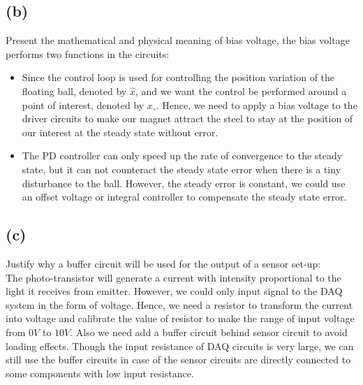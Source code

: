 \documentclass[letterpaper]{article}
\begin{document}
\subsection*{(b)}
Present the mathematical and physical meaning of bias voltage, the bias voltage performs two functions in the circuits:
\begin{itemize}
	\item Since the control loop is used for controlling the position variation of the floating ball, denoted by $\hat{x}$, and we want the control be performed around a point of interest, denoted by $x_\circ$. Hence, we need to apply a bias voltage to the driver circuits to make our magnet attract the steel to stay at the position of our interest at the steady state without error.
	\item The PD controller can only speed up the rate of convergence to the steady state, but it can not counteract the steady state error when there is a tiny disturbance to the ball. However, the steady error is constant, we could use an offset voltage or integral controller to compensate the steady state error.
	
\end{itemize}
\subsection*{(c)}
Justify why a buffer circuit will be used for the output of a sensor set-up:\\
The photo-transistor will generate a current with intensity proportional to the light it receives from emitter. However, we could only input signal to the DAQ system in the form of voltage. Hence, we need a resistor to transform the current into voltage and calibrate the value of resistor to make the range of input voltage from $0 V$ to $10 V$. Also we need add a buffer circuit behind sensor circuit to avoid loading effects. Though the input resistance of DAQ circuits is very large, we can still use the buffer circuits in case of the sensor circuits are directly connected to some components with low input resistance.
\end{document}
